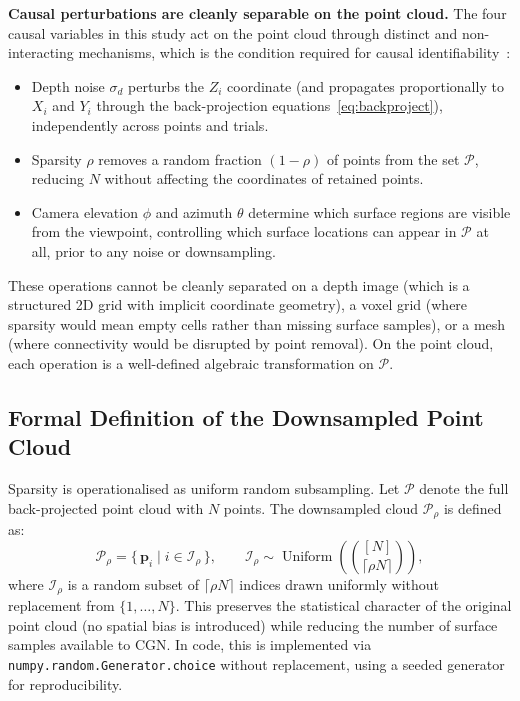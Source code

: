 \documentclass[11pt,a4paper]{report}
\begin{document}
\textbf{Causal perturbations are cleanly separable on the point cloud.}
The four causal variables in this study act on the point cloud through distinct
and non-interacting mechanisms, which is the condition required for causal
identifiability~\cite{pearl2009causality}:
\begin{itemize}
  \item Depth noise $\sigma_d$ perturbs the $Z_i$ coordinate (and propagates
        proportionally to $X_i$ and $Y_i$ through the back-projection
        equations~\eqref{eq:backproject}), independently across points and trials.
  \item Sparsity $\rho$ removes a random fraction $(1 - \rho)$ of points from the
        set $\mathcal{P}$, reducing $N$ without affecting the coordinates of
        retained points.
  \item Camera elevation $\phi$ and azimuth $\theta$ determine which surface regions
        are visible from the viewpoint, controlling which surface locations can
        appear in $\mathcal{P}$ at all, prior to any noise or downsampling.
\end{itemize}
These operations cannot be cleanly separated on a depth image (which is a
structured 2D grid with implicit coordinate geometry), a voxel grid (where
sparsity would mean empty cells rather than missing surface samples), or a mesh
(where connectivity would be disrupted by point removal).  On the point cloud,
each operation is a well-defined algebraic transformation on $\mathcal{P}$.

\subsection{Formal Definition of the Downsampled Point Cloud}
\label{sec:pointcloud_downsampling}

Sparsity is operationalised as uniform random subsampling.  Let $\mathcal{P}$
denote the full back-projected point cloud with $N$ points.  The downsampled
cloud $\mathcal{P}_\rho$ is defined as:
\begin{equation}
  \mathcal{P}_\rho = \bigl\{\, \mathbf{p}_i \;\big|\; i \in \mathcal{I}_\rho \,\bigr\},
  \qquad
  \mathcal{I}_\rho \sim \operatorname{Uniform}\!\left(\binom{[N]}{\lceil \rho N \rceil}\right),
  \label{eq:downsampled_cloud}
\end{equation}
where $\mathcal{I}_\rho$ is a random subset of $\lceil \rho N \rceil$ indices
drawn uniformly without replacement from $\{1, \ldots, N\}$.  This preserves the
statistical character of the original point cloud (no spatial bias is introduced)
while reducing the number of surface samples available to CGN.  In code, this is
implemented via \texttt{numpy.random.Generator.choice} without replacement, using
a seeded generator for reproducibility.
\end{document}
